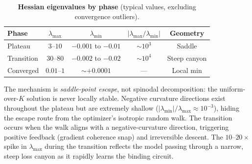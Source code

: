 \documentclass{article}
\begin{document}
\begin{table}[h]
\centering
\caption{\textbf{Hessian eigenvalues by phase} (typical values, excluding convergence outliers).}
\label{tab:hessian}
\vspace{4pt}
\small
\begin{tabular}{@{}lcccc@{}}
\toprule
Phase & $\lambda_\text{max}$ & $\lambda_\text{min}$ & $|\lambda_\text{max}/\lambda_\text{min}|$ & Geometry \\
\midrule
Plateau & $3$--$10$ & $-0.001$ to $-0.01$ & ${\sim}10^3$ & Saddle \\
Transition & $30$--$80$ & $-0.002$ to $-0.02$ & ${\sim}10^4$ & Steep canyon \\
Converged & $0.01$--$1$ & ${\sim}+0.0001$ & --- & Local min \\
\bottomrule
\end{tabular}
\end{table}

The mechanism is \emph{saddle-point escape}, not spinodal decomposition: the uniform-over-$K$ solution is never locally stable. Negative curvature directions exist throughout the plateau but are extremely shallow ($|\lambda_\text{min}|/\lambda_\text{max} \approx 10^{-3}$), hiding the escape route from the optimizer's isotropic random walk. The transition occurs when the walk aligns with a negative-curvature direction, triggering positive feedback (gradient coherence snap) and irreversible descent. The $10$--$20\times$ spike in $\lambda_\text{max}$ during the transition reflects the model passing through a narrow, steep loss canyon as it rapidly learns the binding circuit.
\end{document}
